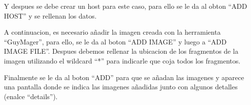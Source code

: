 \documentclass{article}
\begin{document}

Y despues se debe crear un host para este caso, para ello se le da al obton ``ADD HOST'' y se rellenan los datos.


A continuacion, es necesario añadir la imagen creada con la herramienta ``GuyMager'', para ello, se le da al boton ``ADD IMAGE'' y luego a ``ADD IMAGE FILE''. Despues debemos rellenar la ubicacion de los fragmentos de la imagen utilizando el wildcard ``*'' para indicarle que coja todos los fragmentos.


Finalmente se le da al boton ``ADD'' para que se añadan las imagenes y aparece una pantalla donde se indica las imagenes añadidas junto con algunos detalles (enalce ``details'').
\end{document}
